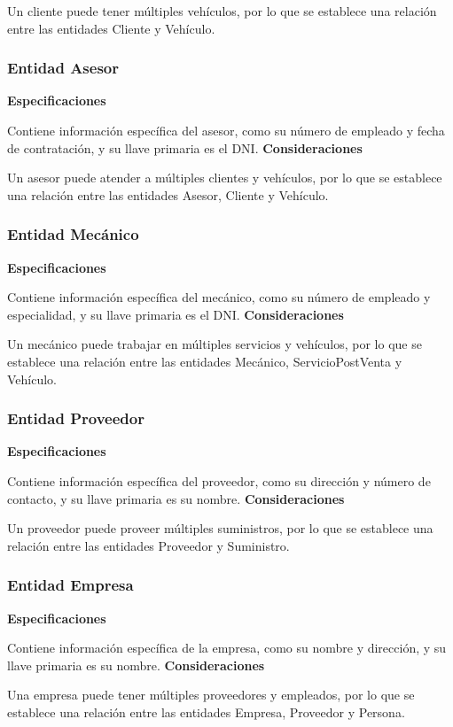 \documentclass[12pt]{article}
\begin{document}
Un cliente puede tener múltiples vehículos, por lo que se establece una relación entre las entidades Cliente y Vehículo.

\subsubsection{Entidad Asesor}
\textbf{Especificaciones}

Contiene información específica del asesor, como su número de empleado y fecha de contratación, y su llave primaria es el DNI.
\textbf{Consideraciones}

Un asesor puede atender a múltiples clientes y vehículos, por lo que se establece una relación entre las entidades Asesor, Cliente y Vehículo.

\subsubsection{Entidad Mecánico}
\textbf{Especificaciones}

Contiene información específica del mecánico, como su número de empleado y especialidad, y su llave primaria es el DNI.
\textbf{Consideraciones}

Un mecánico puede trabajar en múltiples servicios y vehículos, por lo que se establece una relación entre las entidades Mecánico, ServicioPostVenta y Vehículo.

\subsubsection{Entidad Proveedor}
\textbf{Especificaciones}

Contiene información específica del proveedor, como su dirección y número de contacto, y su llave primaria es su nombre.
\textbf{Consideraciones}

Un proveedor puede proveer múltiples suministros, por lo que se establece una relación entre las entidades Proveedor y Suministro.

\subsubsection{Entidad Empresa}
\textbf{Especificaciones}

Contiene información específica de la empresa, como su nombre y dirección, y su llave primaria es su nombre.
\textbf{Consideraciones}

Una empresa puede tener múltiples proveedores y empleados, por lo que se establece una relación entre las entidades Empresa, Proveedor y Persona.
\end{document}
